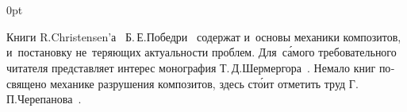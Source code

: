 \section*{\small \wordforbibliography}

\begin{changemargin}{\parindent}{0pt}
\fontsize{10}{12}\selectfont

\begin{otherlanguage}{russian}

Книги R.\:Christensen’а~\cite{christensen-compositematerials}  Б.\,Е.\:Победри~\cite{pobedrya-composites} содержат и~основы механики композитов, и~постановку не~теряющих актуальности проблем.
Для~с\'{а}мого требовательного читателя представляет интерес монография Т.\,Д.\:Шермергора~\cite{shermergor}.
Немало книг посвящено механике разрушения композитов, здесь ст\'{о}ит отметить труд Г.\,П.\:Черепанова~\cite{cherepanov-compositematerialfracture}.

\end{otherlanguage}

\end{changemargin}
